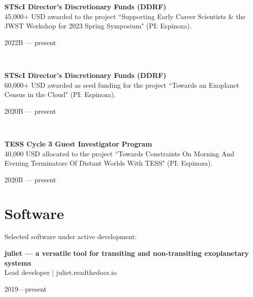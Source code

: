\documentclass[12pt, a4paper]{article} %
\begin{document}
\begin{minipage}[t]{0.7\textwidth}
\begin{flushleft}%
  \setlength{\leftskip}{0.2cm}%
\textbf{STScI Director's Discretionary Funds (DDRF)}\\
45,000+ USD awarded to the project ``Supporting Early Career Scientists \& the JWST Workshop for 2023 Spring Symposium" (PI: Espinoza).
\end{flushleft}
\end{minipage}
\begin{minipage}[t]{0.3\textwidth}
\hfill 2022B --- present
\end{minipage}\\

\begin{minipage}[t]{0.7\textwidth}
\begin{flushleft}%
  \setlength{\leftskip}{0.2cm}%
\textbf{STScI Director's Discretionary Funds (DDRF)}\\
60,000+ USD awarded as seed funding for the project ``Towards an Exoplanet Census in the Cloud" (PI: Espinoza).
\end{flushleft}
\end{minipage}
\begin{minipage}[t]{0.3\textwidth}
\hfill 2020B --- present
\end{minipage}\\

\begin{minipage}[t]{0.7\textwidth}
\begin{flushleft}%
  \setlength{\leftskip}{0.2cm}%
\textbf{TESS Cycle 3 Guest Investigator Program}\\
40,000 USD allocated to the project ``Towards Constraints On Morning And Evening Terminators Of Distant Worlds With TESS" (PI: Espinoza).
\end{flushleft}
\end{minipage}
\begin{minipage}[t]{0.3\textwidth}
\hfill 2020B --- present
\end{minipage}

\section*{Software}
Selected software under active development:\\

\begin{minipage}[t]{0.7\textwidth}
\begin{flushleft}%
  \setlength{\leftskip}{0.2cm}%
\textbf{juliet --- a versatile tool for transiting and non-transiting exoplanetary systems}\\
Lead developer | juliet.readthedocs.io
\end{flushleft}
\end{minipage}
\begin{minipage}[t]{0.3\textwidth}
\hfill 2019---present
\end{minipage}\\
\end{document}
